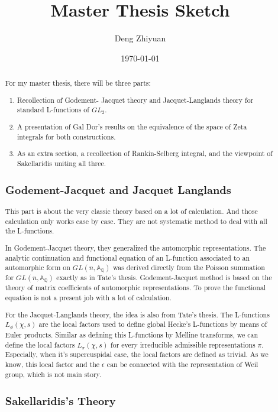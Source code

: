 \documentclass[12pt,a4paper,english]{article}
\title{Master Thesis Sketch}
\date{\today}
\author{Deng Zhiyuan}
\theoremstyle{plain}
\theoremstyle{definition}
\begin{document}
\maketitle
\newpage

\tableofcontents
\newpage

\begin{abstract}
For my master thesis, there will be three parts:
\begin{enumerate}
    \item Recollection of Godement- Jacquet theory and Jacquet-Langlands theory for standard L-functions of $GL_{2}$\cite{godement1974notes,goldfeld2006automorphic}.
    \item A presentation of Gal Dor's results on the equivalence of the space of Zeta integrals for both constructions\cite{dor2020exotic}.
    \item As an extra section, a recollection of Rankin-Selberg integral, and the viewpoint of Sakellaridis uniting all three\cite{sakellaridis2021spherical}.
\end{enumerate}
\subsection*{Godement-Jacquet and Jacquet Langlands}
This part is about the very classic theory based on a lot of calculation. And those calculation only works case by case. They are not systematic method to deal with all the L-functions. 

In Godement-Jacquet theory, they generalized the automorphic representations. The analytic continuation and functional equation of an L-function associated to an automorphic form on $GL(n, \mathbb{A}_{\mathbb{Q}})$ was derived directly from the Poisson summation for $GL(n, \mathbb{A}_{\mathbb{Q}})$ exactly as in Tate's thesis. Godement-Jacquet method is based on the theory of matrix coefficients of automorphic representations. To prove the functional equation is not a present job with a lot of calculation. 

For the Jacquet-Langlands theory, the idea is also from Tate's thesis. The L-functions $L_{\phi}(\chi,s)$ are the local factors used to define global Hecke's L-functions by means of Euler products. Similar as defining this L-functions by Melline transforms, we can define the local factors $L_{\pi}(\chi,s)$ for every irreducible admissible representations $\pi$. Especially, when it's supercuspidal case, the local factors are defined as trivial. As we know, this local factor and the $\epsilon$ can be connected with the representation of Weil group, which is not main story.


\subsection*{Sakellaridis's Theory}

\end{abstract}
\newpage
\end{document}
